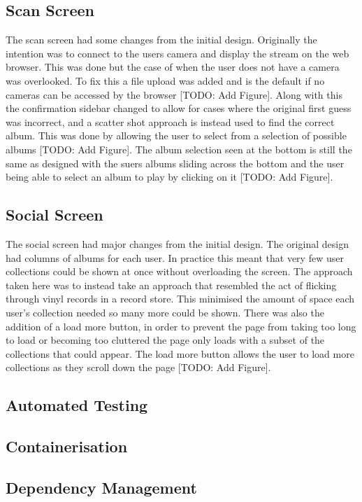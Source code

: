 \subsection{Scan Screen}
The scan screen had some changes from the initial design. Originally the intention was to connect to the users camera and display the stream on the web browser. This was done but the case of when the user does not have a camera was overlooked. To fix this a file upload was added and is the default if no cameras can be accessed by the browser [TODO: Add Figure]. Along with this the confirmation sidebar changed to allow for cases where the original first guess was incorrect, and a scatter shot approach is instead used to find the correct album. This was done by allowing the user to select from a selection of possible albums [TODO: Add Figure].
The album selection seen at the bottom is still the same as designed with the suers albums sliding across the bottom and the user being able to select an album to play by clicking on it [TODO: Add Figure].

\subsection{Social Screen}
The social screen had major changes from the initial design. The original design had columns of albums for each user. In practice this meant that very few user collections could be shown at once without overloading the screen. The approach taken here was to instead take an approach that resembled the act of flicking through vinyl records in a record store. This minimised the amount of space each user's collection needed so many more could be shown. There was also the addition of a load more button, in order to prevent the page from taking too long to load or becoming too cluttered the page only loads with a subset of the collections that could appear. The load more button allows the user to load more collections as they scroll down the page [TODO: Add Figure].

\subsection{Automated Testing}
\subsection{Containerisation}
\subsection{Dependency Management}
